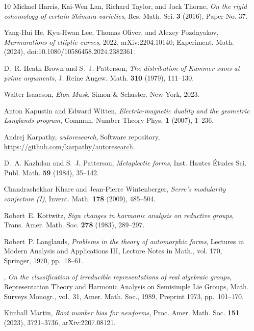 \documentclass[11pt]{amsart}
\numberwithin{equation}{section}
\begin{document}
\begin{thebibliography}{10}
Michael Harris, Kai-Wen Lan, Richard Taylor, and Jack Thorne, \emph{On the
  rigid cohomology of certain {S}himura varieties}, Res. Math. Sci. \textbf{3}
  (2016), Paper No. 37.

Yang-Hui He, Kyu-Hwan Lee, Thomas Oliver, and Alexey Pozdnyakov,
  \emph{Murmurations of elliptic curves}, 2022, arXiv:2204.10140; Experiment.
  Math. (2024), doi:10.1080/10586458.2024.2382361.

D.~R. Heath-Brown and S.~J. Patterson, \emph{The distribution of {K}ummer sums
  at prime arguments}, J. Reine Angew. Math. \textbf{310} (1979), 111--130.

Walter Isaacson, \emph{Elon {M}usk}, Simon \& Schuster, New York, 2023.

Anton Kapustin and Edward Witten, \emph{Electric-magnetic duality and the
  geometric {L}anglands program}, Commun. Number Theory Phys. \textbf{1}
  (2007), 1--236.

Andrej Karpathy, \emph{autoresearch}, Software repository,
  \url{https://github.com/karpathy/autoresearch}.

D.~A. Kazhdan and S.~J. Patterson, \emph{Metaplectic forms}, Inst. Hautes
  {\'E}tudes Sci. Publ. Math. \textbf{59} (1984), 35--142.

Chandrashekhar Khare and Jean-Pierre Wintenberger, \emph{Serre's modularity
  conjecture ({I})}, Invent. Math. \textbf{178} (2009), 485--504.

Robert~E. Kottwitz, \emph{Sign changes in harmonic analysis on reductive
  groups}, Trans. Amer. Math. Soc. \textbf{278} (1983), 289--297.

Robert~P. Langlands, \emph{Problems in the theory of automorphic forms},
  Lectures in Modern Analysis and Applications {III}, Lecture Notes in Math.,
  vol. 170, Springer, 1970, pp.~18--61.

\bysame, \emph{On the classification of irreducible representations of real
  algebraic groups}, Representation Theory and Harmonic Analysis on Semisimple
  {L}ie Groups, Math. Surveys Monogr., vol.~31, Amer. Math. Soc., 1989,
  Preprint 1973, pp.~101--170.

Kimball Martin, \emph{Root number bias for newforms}, Proc. Amer. Math. Soc.
  \textbf{151} (2023), 3721--3736, arXiv:2207.08121.


\end{thebibliography}
\end{document}
